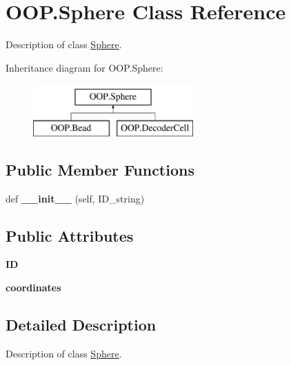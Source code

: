 \hypertarget{class_o_o_p_1_1_sphere}{}\section{O\+O\+P.\+Sphere Class Reference}
\label{class_o_o_p_1_1_sphere}


Description of class \mbox{\hyperlink{class_o_o_p_1_1_sphere}{Sphere}}.  


Inheritance diagram for O\+O\+P.\+Sphere\+:\begin{figure}[H]
\begin{center}
\leavevmode
\includegraphics[height=2.000000cm]{class_o_o_p_1_1_sphere}
\end{center}
\end{figure}
\subsection*{Public Member Functions}
\begin{DoxyCompactItemize}
\item 
\mbox{\label{class_o_o_p_1_1_sphere_a3f45e72c60b658da5354ed89fe552e7c}} 
def {\bfseries \+\_\+\+\_\+init\+\_\+\+\_\+} (self, I\+D\+\_\+string)
\end{DoxyCompactItemize}
\subsection*{Public Attributes}
\begin{DoxyCompactItemize}
\item 
\mbox{\label{class_o_o_p_1_1_sphere_af3d45ee63da13a194f9ac1403b4f6809}} 
{\bfseries ID}
\item 
\mbox{\label{class_o_o_p_1_1_sphere_a9645d2ffa63285cba9e349944438bc3f}} 
{\bfseries coordinates}
\end{DoxyCompactItemize}


\subsection{Detailed Description}
Description of class \mbox{\hyperlink{class_o_o_p_1_1_sphere}{Sphere}}. 


